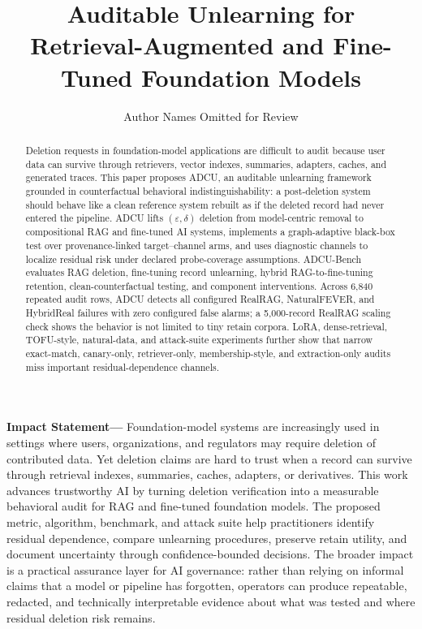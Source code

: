 \documentclass[10pt,twocolumn]{article}
\title{\vspace{-2em}Auditable Unlearning for Retrieval-Augmented and Fine-Tuned Foundation Models}
\author{Author Names Omitted for Review}
\date{}
\newcommand{\method}{ADCU}
\newcommand{\bench}{ADCU-Bench}
\begin{document}
\maketitle

\begin{abstract}
Deletion requests in foundation-model applications are difficult to audit because user data can survive through retrievers, vector indexes, summaries, adapters, caches, and generated traces. This paper proposes \method{}, an auditable unlearning framework grounded in counterfactual behavioral indistinguishability: a post-deletion system should behave like a clean reference system rebuilt as if the deleted record had never entered the pipeline. \method{} lifts $(\varepsilon,\delta)$ deletion from model-centric removal to compositional RAG and fine-tuned AI systems, implements a graph-adaptive black-box test over provenance-linked target--channel arms, and uses diagnostic channels to localize residual risk under declared probe-coverage assumptions. \bench{} evaluates RAG deletion, fine-tuning record unlearning, hybrid RAG-to-fine-tuning retention, clean-counterfactual testing, and component interventions. Across 6,840 repeated audit rows, \method{} detects all configured RealRAG, NaturalFEVER, and HybridReal failures with zero configured false alarms; a 5,000-record RealRAG scaling check shows the behavior is not limited to tiny retain corpora. LoRA, dense-retrieval, TOFU-style, natural-data, and attack-suite experiments further show that narrow exact-match, canary-only, retriever-only, membership-style, and extraction-only audits miss important residual-dependence channels.
\end{abstract}

\noindent\textbf{Impact Statement---}
Foundation-model systems are increasingly used in settings where users, organizations, and regulators may require deletion of contributed data. Yet deletion claims are hard to trust when a record can survive through retrieval indexes, summaries, caches, adapters, or derivatives. This work advances trustworthy AI by turning deletion verification into a measurable behavioral audit for RAG and fine-tuned foundation models. The proposed metric, algorithm, benchmark, and attack suite help practitioners identify residual dependence, compare unlearning procedures, preserve retain utility, and document uncertainty through confidence-bounded decisions. The broader impact is a practical assurance layer for AI governance: rather than relying on informal claims that a model or pipeline has forgotten, operators can produce repeatable, redacted, and technically interpretable evidence about what was tested and where residual deletion risk remains.
\end{document}
